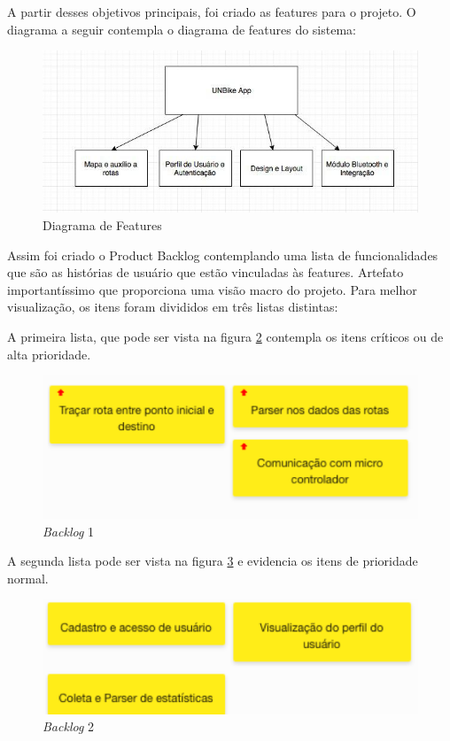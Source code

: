A partir desses objetivos principais, foi criado as features para o projeto. O diagrama a seguir contempla o diagrama de features do sistema:

\begin{figure}[!htb]
	\centering
	\includegraphics[scale=0.80]{features.jpg}
	\caption{Diagrama de Features}
	\label{img:features}
\end{figure}

Assim foi criado o Product Backlog contemplando uma lista de funcionalidades que são as histórias de usuário que estão vinculadas às features. Artefato importantíssimo que proporciona uma visão macro do projeto. Para melhor visualização, os itens foram divididos em três listas distintas:

A primeira lista, que pode ser vista na figura \ref{img:figura1} contempla os itens críticos ou de alta prioridade.

\graphicspath{{figuras/}}
\begin{figure}[!htb]
\centering
\includegraphics[scale=0.80]{figura1}
\caption{\textit{Backlog} 1}
\label{img:figura1}
\end{figure}

A segunda lista pode ser vista na figura \ref{img:figura2} e evidencia os itens de prioridade normal.

\newpage

\graphicspath{{figuras/}}
\begin{figure}[!htb]
\centering
\includegraphics[scale=0.80]{figura2}
\caption{\textit{Backlog} 2}
\label{img:figura2}
\end{figure}

